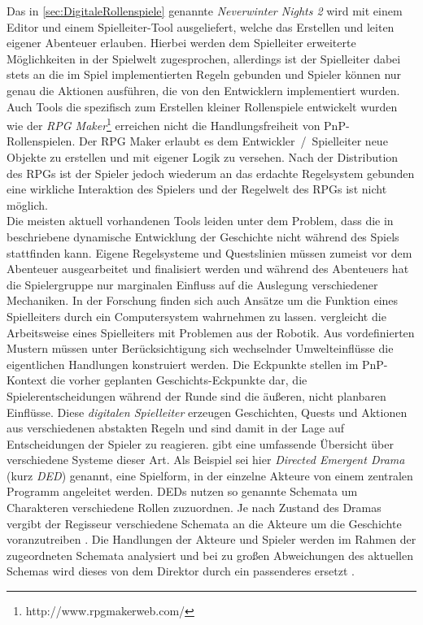 Das in \ref{sec:DigitaleRollenspiele} genannte \emph{Neverwinter Nights 2} wird mit einem Editor und einem Spielleiter-Tool ausgeliefert, welche das Erstellen und leiten eigener Abenteuer erlauben. Hierbei werden dem Spielleiter erweiterte Möglichkeiten in der Spielwelt zugesprochen, allerdings ist der Spielleiter dabei stets an die im Spiel implementierten Regeln gebunden und Spieler können nur genau die Aktionen ausführen, die von den Entwicklern implementiert wurden.~\cite{Tychsen2006a}\newline
Auch Tools die spezifisch zum Erstellen kleiner Rollenspiele entwickelt wurden wie der \emph{RPG Maker}\footnote{http://www.rpgmakerweb.com/} erreichen nicht die Handlungsfreiheit von PnP-Rollenspielen. Der RPG Maker erlaubt es dem Entwickler~/~Spielleiter neue Objekte zu erstellen und mit eigener Logik zu versehen. Nach der Distribution des RPGs ist der Spieler jedoch wiederum an das erdachte Regelsystem gebunden eine wirkliche Interaktion des Spielers und der Regelwelt des RPGs ist nicht möglich.\\
Die meisten aktuell vorhandenen Tools leiden unter dem Problem, dass die in \cite{Arinbjarnar} beschriebene dynamische Entwicklung der Geschichte nicht während des Spiels stattfinden kann. Eigene Regelsysteme und Questslinien müssen zumeist vor dem Abenteuer ausgearbeitet und finalisiert werden und während des Abenteuers hat die Spielergruppe nur marginalen Einfluss auf die Auslegung verschiedener Mechaniken.\newline
In der Forschung finden sich auch Ansätze um die Funktion eines Spielleiters durch ein Computersystem wahrnehmen zu lassen. \cite{Aylett2007} vergleicht die Arbeitsweise eines Spielleiters mit Problemen aus der Robotik. Aus vordefinierten Mustern müssen unter Berücksichtigung sich wechselnder Umwelteinflüsse die eigentlichen Handlungen konstruiert werden. Die Eckpunkte stellen im PnP-Kontext die vorher geplanten Geschichts-Eckpunkte dar, die Spielerentscheidungen während der Runde sind die äußeren, nicht planbaren Einflüsse.\newline
Diese \emph{digitalen Spielleiter} erzeugen Geschichten, Quests und Aktionen aus verschiedenen abstakten Regeln und sind damit in der Lage auf Entscheidungen der Spieler zu reagieren. \cite{Arinbjarnarb} gibt eine umfassende Übersicht über verschiedene Systeme dieser Art. Als Beispiel sei hier \emph{Directed Emergent Drama} (kurz \emph{DED}) \cite{Arinbjarnara} genannt, eine Spielform, in der einzelne Akteure von einem zentralen Programm angeleitet werden. DEDs nutzen so genannte Schemata um Charakteren verschiedene Rollen zuzuordnen. Je nach Zustand des Dramas vergibt der Regisseur verschiedene Schemata an die Akteure um die Geschichte voranzutreiben \cite{Arinbjarnarb}. Die Handlungen der Akteure und Spieler werden im Rahmen der zugeordneten Schemata analysiert und bei zu großen Abweichungen des aktuellen Schemas wird dieses von dem Direktor durch ein passenderes ersetzt \cite{Arinbjarnar}.\newline
